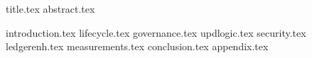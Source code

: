 \documentclass[11pt]{llncs}
\begin{document}
{title.tex}
{abstract.tex}

{introduction.tex}
{lifecycle.tex}
{governance.tex}
{updlogic.tex}
{security.tex}
{ledgerenh.tex}
{measurements.tex}
{conclusion.tex}
{appendix.tex}


\end{document}
